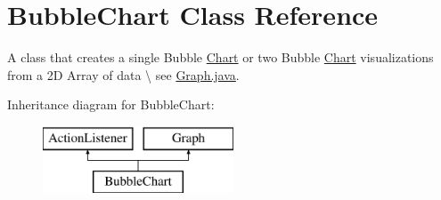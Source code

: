 \hypertarget{class_bubble_chart}{\section{Bubble\-Chart Class Reference}
\label{class_bubble_chart}
}


A class that creates a single Bubble \hyperlink{interface_chart}{Chart} or two Bubble \hyperlink{interface_chart}{Chart} visualizations from a 2\-D Array of data \textbackslash{} see \hyperlink{_graph_8java}{Graph.\-java}.  


Inheritance diagram for Bubble\-Chart\-:\begin{figure}[H]
\begin{center}
\leavevmode
\includegraphics[height=2.000000cm]{class_bubble_chart}
\end{center}
\end{figure}
